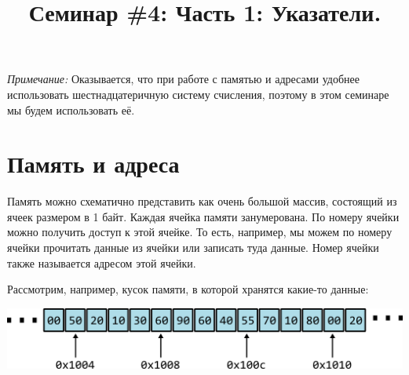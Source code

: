 \documentclass{article}
\begin{document}


\title{Семинар \#4: Часть 1: Указатели. \vspace{-5ex}}\date{}\maketitle

\textit{Примечание:} Оказывается, что при работе с памятью и адресами удобнее использовать шестнадцатеричную систему счисления, поэтому в этом семинаре мы будем использовать её.

\section*{Память и адреса}

Память можно схематично представить как очень большой массив, состоящий из ячеек размером в 1 байт.
Каждая ячейка памяти занумерована. По номеру ячейки можно получить доступ к этой ячейке.
То есть, например, мы можем по номеру ячейки прочитать данные из ячейки или записать туда данные.
Номер ячейки также называется адресом этой ячейки.

Рассмотрим, например, кусок памяти, в которой хранятся какие-то данные:

\begin{center}
\includegraphics[scale=1]{../images/memory1.png}
\end{center}
\end{document}
